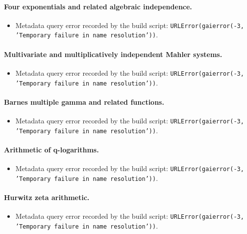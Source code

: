 \documentclass[11pt]{article}
\numberwithin{equation}{section}
\theoremstyle{definition}
\theoremstyle{remark}
\begin{document}
\paragraph{Four exponentials and related algebraic independence.}
\begin{itemize}
\item Metadata query error recorded by the build script: \texttt{URLError(gaierror(-3, 'Temporary failure in name resolution'))}.
\end{itemize}
\paragraph{Multivariate and multiplicatively independent Mahler systems.}
\begin{itemize}
\item Metadata query error recorded by the build script: \texttt{URLError(gaierror(-3, 'Temporary failure in name resolution'))}.
\end{itemize}
\paragraph{Barnes multiple gamma and related functions.}
\begin{itemize}
\item Metadata query error recorded by the build script: \texttt{URLError(gaierror(-3, 'Temporary failure in name resolution'))}.
\end{itemize}
\paragraph{Arithmetic of q-logarithms.}
\begin{itemize}
\item Metadata query error recorded by the build script: \texttt{URLError(gaierror(-3, 'Temporary failure in name resolution'))}.
\end{itemize}
\paragraph{Hurwitz zeta arithmetic.}
\begin{itemize}
\item Metadata query error recorded by the build script: \texttt{URLError(gaierror(-3, 'Temporary failure in name resolution'))}.
\end{itemize}
\end{document}
